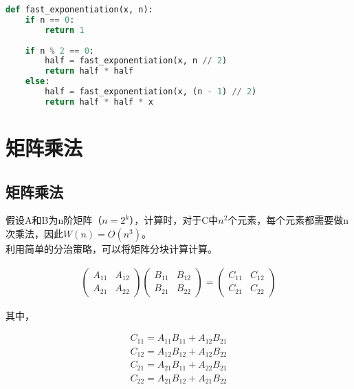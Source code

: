 
\begin{lstlisting}[language=Python]
def fast_exponentiation(x, n):
    if n == 0:
        return 1
    
    if n % 2 == 0:
        half = fast_exponentiation(x, n // 2)
        return half * half
    else:
        half = fast_exponentiation(x, (n - 1) // 2)
        return half * half * x
\end{lstlisting}

\newpage

\section{矩阵乘法}

\subsection{矩阵乘法}

假设A和B为n阶矩阵（$ n = 2^k $），计算时，对于C中$ n^2 $个元素，每个元素都需要做n次乘法，因此$ W(n) = O(n^3) $。\\

利用简单的分治策略，可以将矩阵分块计算计算。

\vspace{-0.5cm}

\begin{align*}
	\left( \begin{matrix}
		A_{11} & A_{12} \\
		A_{21} & A_{22}
	\end{matrix} \right)
	\left( \begin{matrix}
		B_{11} & B_{12} \\
		B_{21} & B_{22}
	\end{matrix} \right)
	=
	\left( \begin{matrix}
		C_{11} & C_{12} \\
		C_{21} & C_{22}
	\end{matrix} \right)
\end{align*}

其中，

\vspace{-1cm}

\begin{align*}
	C_{11} = A_{11}B_{11} + A_{12}B_{21} \\
	C_{12} = A_{12}B_{12} + A_{12}B_{22} \\
	C_{21} = A_{21}B_{11} + A_{22}B_{21} \\
	C_{22} = A_{21}B_{12} + A_{21}B_{22}
\end{align*}

